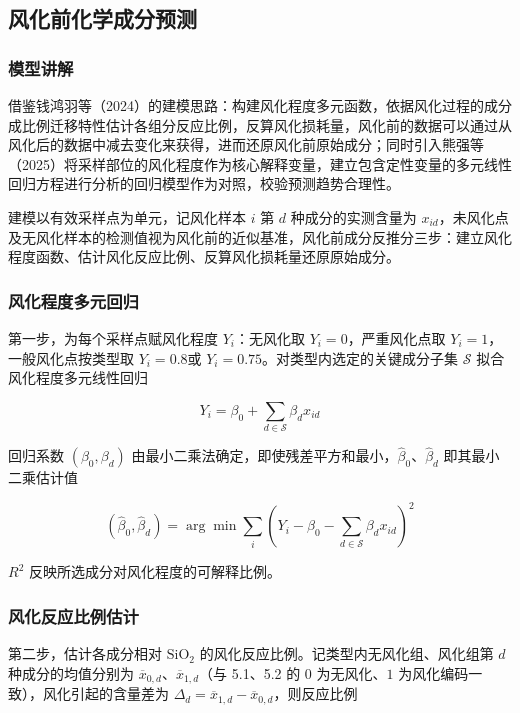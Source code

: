 \documentclass{ctexart}
\begin{document}
\subsection{风化前化学成分预测}

\subsubsection{模型讲解}

借鉴钱鸿羽等（2024）的建模思路：构建风化程度多元函数，依据风化过程的成分成比例迁移特性估计各组分反应比例，反算风化损耗量，风化前的数据可以通过从风化后的数据中减去变化来获得，进而还原风化前原始成分；同时引入熊强等（2025）将采样部位的风化程度作为核心解释变量，建立包含定性变量的多元线性回归方程进行分析的回归模型作为对照，校验预测趋势合理性。

建模以有效采样点为单元，记风化样本 $i$ 第 $d$ 种成分的实测含量为 $x_{id}$，未风化点及无风化样本的检测值视为风化前的近似基准，风化前成分反推分三步：建立风化程度函数、估计风化反应比例、反算风化损耗量还原原始成分。


\subsubsection{风化程度多元回归}

第一步，为每个采样点赋风化程度 $Y_i$：无风化取 $Y_i=0$，严重风化点取 $Y_i=1$，一般风化点按类型取 $Y_i=0.8$或 $Y_i=0.75$。对类型内选定的关键成分子集 $\mathcal{S}$ 拟合风化程度多元线性回归

\begin{equation*}
Y_i=\beta_{0}+\sum_{d\in\mathcal{S}}\beta_{d}x_{id}
\end{equation*}

回归系数 $(\beta_0,\beta_d)$ 由最小二乘法确定，即使残差平方和最小，$\widehat{\beta}_0$、$\widehat{\beta}_d$ 即其最小二乘估计值

\begin{equation*}
(\widehat\beta_{0},\widehat\beta_{d})=\arg\min\sum_{i}(Y_i-\beta_{0}-\sum_{d\in\mathcal{S}}\beta_{d}x_{id})^{2}
\end{equation*}

$R^2$ 反映所选成分对风化程度的可解释比例。


\subsubsection{风化反应比例估计}

第二步，估计各成分相对 $\mathrm{SiO_2}$ 的风化反应比例。记类型内无风化组、风化组第 $d$ 种成分的均值分别为 $\overline{x}_{0,d}$、$\overline{x}_{1,d}$（与 5.1、5.2 的 $0$ 为无风化、$1$ 为风化编码一致），风化引起的含量差为 $\Delta_{d}=\overline{x}_{1,d}-\overline{x}_{0,d}$，则反应比例
\end{document}
